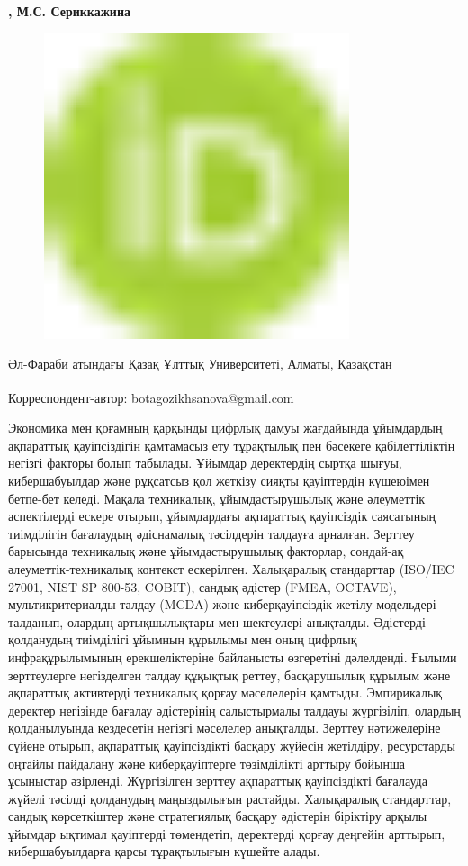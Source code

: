 {\bfseries , М.С.
Сериккажина}
\begin{figure}[H]
	\centering
	\includegraphics[width=0.8\textwidth]{media/ict/image16}
	\caption*{}
\end{figure}


Әл-Фараби атындағы Қазақ Ұлттық Университеті, Алматы, Қазақстан

{\bfseries \textsuperscript{\envelope }}Корреспондент-автор:
botagozikhsanova@gmail.com

Экономика мен қоғамның қарқынды цифрлық дамуы жағдайында ұйымдардың
ақпараттық қауіпсіздігін қамтамасыз ету тұрақтылық пен бәсекеге
қабілеттіліктің негізгі факторы болып табылады. Ұйымдар деректердің
сыртқа шығуы, кибершабуылдар және рұқсатсыз қол жеткізу сияқты
қауіптердің күшеюімен бетпе-бет келеді. Мақала техникалық,
ұйымдастырушылық және әлеуметтік аспектілерді ескере отырып, ұйымдардағы
ақпараттық қауіпсіздік саясатының тиімділігін бағалаудың әдіснамалық
тәсілдерін талдауға арналған. Зерттеу барысында техникалық және
ұйымдастырушылық факторлар, сондай-ақ әлеуметтік-техникалық контекст
ескерілген. Халықаралық стандарттар (ISO/IEC 27001, NIST SP 800-53,
COBIT), сандық әдістер (FMEA, OCTAVE), мультикритериалды талдау (MCDA)
және киберқауіпсіздік жетілу модельдері талданып, олардың артықшылықтары
мен шектеулері анықталды. Әдістерді қолданудың тиімділігі ұйымның
құрылымы мен оның цифрлық инфрақұрылымының ерекшеліктеріне байланысты
өзгеретіні дәлелденді. Ғылыми зерттеулерге негізделген талдау құқықтық
реттеу, басқарушылық құрылым және ақпараттық активтерді техникалық
қорғау мәселелерін қамтыды. Эмпирикалық деректер негізінде бағалау
әдістерінің салыстырмалы талдауы жүргізіліп, олардың қолданылуында
кездесетін негізгі мәселелер анықталды. Зерттеу нәтижелеріне сүйене
отырып, ақпараттық қауіпсіздікті басқару жүйесін жетілдіру, ресурстарды
оңтайлы пайдалану және киберқауіптерге төзімділікті арттыру бойынша
ұсыныстар әзірленді. Жүргізілген зерттеу ақпараттық қауіпсіздікті
бағалауда жүйелі тәсілді қолданудың маңыздылығын растайды. Халықаралық
стандарттар, сандық көрсеткіштер және стратегиялық басқару әдістерін
біріктіру арқылы ұйымдар ықтимал қауіптерді төмендетіп, деректерді
қорғау деңгейін арттырып, кибершабуылдарға қарсы тұрақтылығын күшейте
алады.

